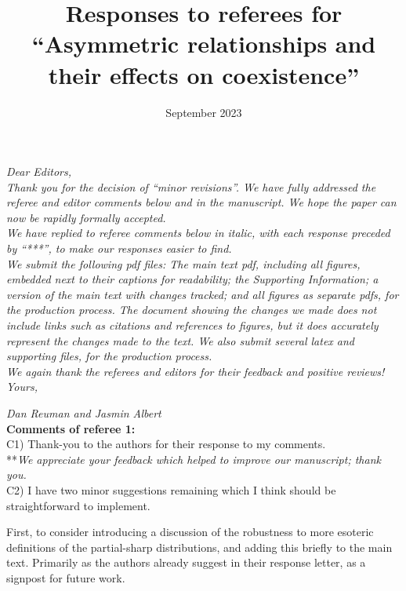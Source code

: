 \documentclass[letterpaper,11pt]{article}
\title{Responses to referees for ``Asymmetric relationships and their effects on coexistence''}
\date{September 2023}
\begin{document}
\noindent \emph{Dear Editors,} \\

\noindent \emph{Thank you for the decision of ``minor revisions''. We have 
fully addressed the referee and editor comments below and in the manuscript.
We hope the paper can now be rapidly formally accepted. } \\

\noindent \emph{We have replied to referee comments below in italic, with each response preceded
by ``***'', to make our responses easier to find.} \\

\noindent \emph{We submit the following pdf files: The main text pdf, including all figures, embedded 
next to their captions for readability; 
the Supporting Information; a version of the main text with changes tracked; and all figures as 
separate pdfs, for the production process. The document showing 
the changes we made does not include links such as citations and
references to figures, but it does accurately represent the changes made to the text.
We also submit several latex and supporting files, for the production process.} \\

\noindent \emph{We again thank the referees and editors for their feedback and positive reviews!} \\

\noindent \emph{Yours,}

\noindent \emph{Dan Reuman and Jasmin Albert} \\


\noindent \textbf{Comments of referee 1:} \\

\noindent C1) Thank-you to the authors for their response to my comments.\\

\noindent ***\emph{We appreciate your feedback which helped to improve our manuscript; thank you.} \\

\noindent C2) I have two minor suggestions remaining which I think should be straightforward to implement.

First, to consider introducing a discussion of the robustness to more esoteric definitions of the partial-sharp distributions, and adding this briefly to the main text.  Primarily as the authors already suggest in their response letter, as a signpost for future work.\\
\end{document}
